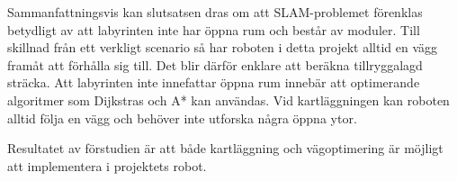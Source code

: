 \documentclass[11pt]{article}
\begin{document}
\begin{flushleft}
Sammanfattningsvis kan slutsatsen dras om att SLAM-problemet förenklas betydligt av att labyrinten inte har öppna rum och består av moduler. Till skillnad från ett verkligt scenario så har roboten i detta projekt alltid en vägg framåt att förhålla sig till. Det blir därför enklare att beräkna tillryggalagd sträcka. Att labyrinten inte innefattar öppna rum innebär att optimerande algoritmer som Dijkstras och A* kan användas. Vid kartläggningen kan roboten alltid följa en vägg och behöver inte utforska några öppna ytor.

Resultatet av förstudien är att både kartläggning och vägoptimering är möjligt att implementera i projektets robot.  

\pagebreak
{}




\end{flushleft}
\end{document}
